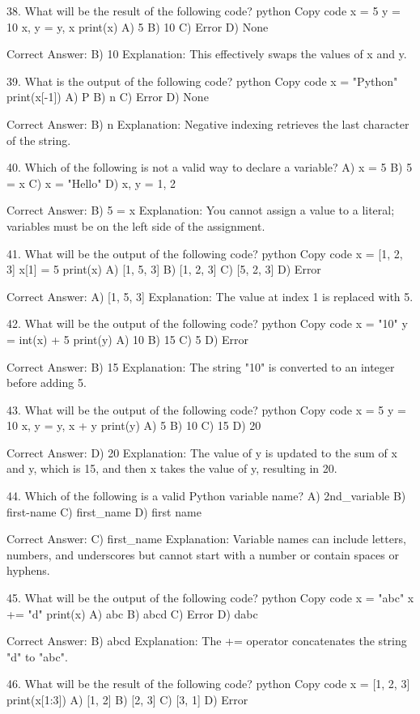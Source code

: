 38. What will be the result of the following code?
python
Copy code
x = 5
y = 10
x, y = y, x
print(x)
A) 5
B) 10
C) Error
D) None

Correct Answer: B) 10
Explanation: This effectively swaps the values of x and y.

39. What is the output of the following code?
python
Copy code
x = "Python"
print(x[-1])
A) P
B) n
C) Error
D) None

Correct Answer: B) n
Explanation: Negative indexing retrieves the last character of the string.

40. Which of the following is not a valid way to declare a variable?
A) x = 5
B) 5 = x
C) x = "Hello"
D) x, y = 1, 2

Correct Answer: B) 5 = x
Explanation: You cannot assign a value to a literal; variables must be on the left side of the assignment.

41. What will be the output of the following code?
python
Copy code
x = [1, 2, 3]
x[1] = 5
print(x)
A) [1, 5, 3]
B) [1, 2, 3]
C) [5, 2, 3]
D) Error

Correct Answer: A) [1, 5, 3]
Explanation: The value at index 1 is replaced with 5.

42. What will be the output of the following code?
python
Copy code
x = "10"
y = int(x) + 5
print(y)
A) 10
B) 15
C) 5
D) Error

Correct Answer: B) 15
Explanation: The string "10" is converted to an integer before adding 5.

43. What will be the output of the following code?
python
Copy code
x = 5
y = 10
x, y = y, x + y
print(y)
A) 5
B) 10
C) 15
D) 20

Correct Answer: D) 20
Explanation: The value of y is updated to the sum of x and y, which is 15, and then x takes the value of y, resulting in 20.

44. Which of the following is a valid Python variable name?
A) 2nd_variable
B) first-name
C) first_name
D) first name

Correct Answer: C) first_name
Explanation: Variable names can include letters, numbers, and underscores but cannot start with a number or contain spaces or hyphens.

45. What will be the output of the following code?
python
Copy code
x = "abc"
x += "d"
print(x)
A) abc
B) abcd
C) Error
D) dabc

Correct Answer: B) abcd
Explanation: The += operator concatenates the string "d" to "abc".

46. What will be the result of the following code?
python
Copy code
x = [1, 2, 3]
print(x[1:3])
A) [1, 2]
B) [2, 3]
C) [3, 1]
D) Error


